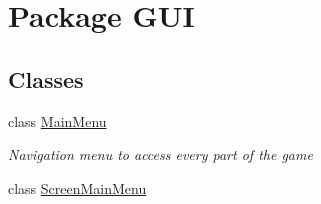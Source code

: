 \hypertarget{namespace_g_u_i}{\section{Package G\+U\+I}
\label{namespace_g_u_i}
}
\subsection*{Classes}
\begin{DoxyCompactItemize}
\item 
class \hyperlink{class_g_u_i_1_1_main_menu}{Main\+Menu}
\begin{DoxyCompactList}\small\item\em Navigation menu to access every part of the game \end{DoxyCompactList}\item 
class \hyperlink{class_g_u_i_1_1_screen_main_menu}{Screen\+Main\+Menu}
\end{DoxyCompactItemize}
